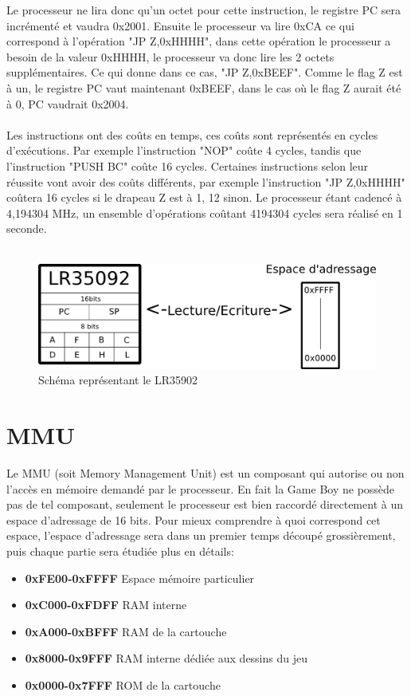 \documentclass{report}
\begin{document}
Le processeur ne lira donc qu'un octet pour cette instruction, le registre PC sera incrémenté et vaudra 0x2001.
Ensuite le processeur va lire 0xCA ce qui correspond à l'opération "JP Z,0xHHHH", dans cette opération le processeur a besoin de la valeur 0xHHHH, le processeur va donc lire les 2 octets supplémentaires. Ce qui donne dans ce cas, "JP Z,0xBEEF".
Comme le flag Z est à un, le registre PC vaut maintenant 0xBEEF, dans le cas où le flag Z aurait été à 0, PC vaudrait 0x2004.\\\\
Les instructions ont des coûts en temps, ces coûts sont représentés en cycles d'exécutions.
Par exemple l'instruction "NOP" coûte 4 cycles, tandis que l'instruction "PUSH BC" coûte 16 cycles.
Certaines instructions selon leur réussite vont avoir des coûts différents, par exemple l'instruction "JP Z,0xHHHH" coûtera 16 cycles si le drapeau Z est à 1, 12 sinon.
Le processeur étant cadencé à 4,194304 MHz, un ensemble d'opérations coûtant 4194304 cycles sera réalisé en 1 seconde.
\\\\
\begin{figure}[!h]
\centering
\includegraphics[scale=0.80]{images/schema_cpu.png}
\caption{Schéma représentant le LR35902}
\end{figure}

\section{MMU}
Le MMU (soit Memory Management Unit) est un composant qui autorise ou non l'accès en mémoire demandé par le processeur.
En fait la Game Boy ne possède pas de tel composant, seulement le processeur est bien raccordé directement à un espace d'adressage de 16 bits.
Pour mieux comprendre à quoi correspond cet espace, l'espace d'adressage sera
dans un premier temps découpé grossièrement, puis chaque partie sera étudiée
plus en détails:\\
\begin{itemize}
\item \textbf{0xFE00-0xFFFF} Espace mémoire particulier
\item \textbf{0xC000-0xFDFF} \gls{RAM} interne
\item \textbf{0xA000-0xBFFF} RAM de la cartouche
\item \textbf{0x8000-0x9FFF} RAM interne dédiée aux dessins du jeu
\item \textbf{0x0000-0x7FFF} \gls{ROM} de la cartouche
\end{itemize}
\end{document}
